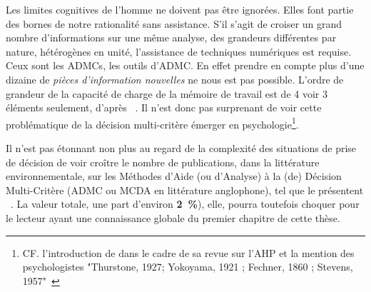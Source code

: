 Les limites cognitives de l'homme ne doivent pas être ignorées.
Elles font partie des bornes de notre rationalité sans assistance.
S'il s'agit de croiser un grand nombre d'informations sur une même analyse, des grandeurs différentes par nature, hétérogènes en unité, l'assistance de techniques numériques est requise.
Ceux sont les \glspl{ADMC}, les outils d'\acrlong{ADMC}.
En effet prendre en compte plus d'une dizaine de \emph{pièces d'information nouvelles} ne nous est pas possible.
L'ordre de grandeur de la capacité de charge de la mémoire de travail est de 4 voir 3 éléments seulement, d'après \citeauthor{farrington_seven_2011}~\cite{farrington_seven_2011}.
Il n'est donc pas surprenant de voir cette problématique de la décision multi-critère émerger en psychologie\footnote{CF. l'introduction de \citeauthor{ishizaka_review_2011} dans le cadre de sa revue sur l'AHP et la mention des psychologistes "Thurstone, 1927; Yokoyama, 1921 ; Fechner, 1860 ; Stevens, 1957"~\cite{ishizaka_review_2011}}.

Il n'est pas étonnant non plus au regard de la complexité des situations de prise de décision de voir croître le nombre de publications, dans la littérature environnementale, sur les Méthodes d'Aide (ou d'Analyse) à la (de) Décision Multi-Critère (ADMC ou MCDA en littérature anglophone), tel que le présentent \citeauthor{huang_multi-criteria_2011}~\cite{huang_multi-criteria_2011}.
La valeur totale, une part d'environ \textbf{2~\%}), elle, pourra toutefois choquer pour le lecteur ayant une connaissance globale du premier chapitre de cette thèse.


